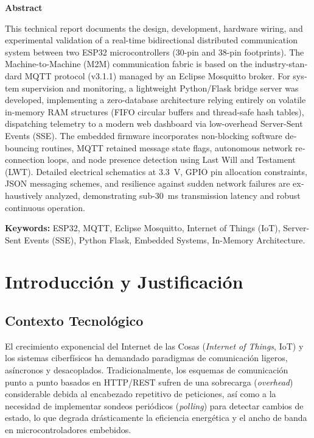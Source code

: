 \documentclass[11pt,a4paper]{article}
\begin{document}
\vspace{1.0cm}
\begin{center}
    \textbf{\large Abstract}
\end{center}
\begin{otherlanguage}{english}
\noindent This technical report documents the design, development, hardware wiring, and experimental validation of a real-time bidirectional distributed communication system between two ESP32 microcontrollers (30-pin and 38-pin footprints). The Machine-to-Machine (M2M) communication fabric is based on the industry-standard MQTT protocol (v3.1.1) managed by an Eclipse Mosquitto broker. For system supervision and monitoring, a lightweight Python/Flask bridge server was developed, implementing a zero-database architecture relying entirely on volatile in-memory RAM structures (FIFO circular buffers and thread-safe hash tables), dispatching telemetry to a modern web dashboard via low-overhead Server-Sent Events (SSE). The embedded firmware incorporates non-blocking software debouncing routines, MQTT retained message state flags, autonomous network reconnection loops, and node presence detection using Last Will and Testament (LWT). Detailed electrical schematics at 3.3~V, GPIO pin allocation constraints, JSON messaging schemes, and resilience against sudden network failures are exhaustively analyzed, demonstrating sub-30~ms transmission latency and robust continuous operation.
\end{otherlanguage}

\vspace{0.5cm}
\noindent \textbf{Keywords:} ESP32, MQTT, Eclipse Mosquitto, Internet of Things (IoT), Server-Sent Events (SSE), Python Flask, Embedded Systems, In-Memory Architecture.

\newpage
\tableofcontents
\vspace{0.8cm}
\listoffigures
\vspace{0.5cm}
\listoftables
\newpage

\section{Introducción y Justificación}

\subsection{Contexto Tecnológico}
El crecimiento exponencial del Internet de las Cosas (\textit{Internet of Things}, IoT) y los sistemas ciberfísicos ha demandado paradigmas de comunicación ligeros, asíncronos y desacoplados. Tradicionalmente, los esquemas de comunicación punto a punto basados en HTTP/REST sufren de una sobrecarga (\textit{overhead}) considerable debida al encabezado repetitivo de peticiones, así como a la necesidad de implementar sondeos periódicos (\textit{polling}) para detectar cambios de estado, lo que degrada drásticamente la eficiencia energética y el ancho de banda en microcontroladores embebidos.
\end{document}
